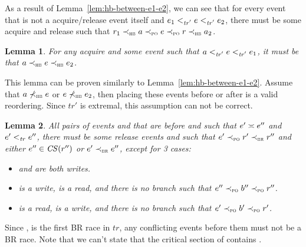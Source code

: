 \documentclass[letter,10pt]{article}
\newtheorem{lem}{Lemma}
\newcommand{\CS}[1]{\ensuremath{\mathit{CS(}#1)}\xspace}
\newcommand{\conflicts}[2]{\ensuremath{#1 \asymp #2}} %
\newcommand{\tr}{\ensuremath{\mathit{tr}}\xspace}
\newcommand{\trPrime}{\ensuremath{\mathit{tr'}}\xspace}
\newcommand{\PO}{PO\xspace}
\newcommand{\HB}{HB\xspace}
\newcommand{\BR}{BR\xspace}
\newcommand{\ltTR}{\ensuremath{<_\textsc{\tr}}\xspace}
\newcommand{\ltTRPrime}{\ensuremath{<_\textsc{\trPrime}}\xspace}
\newcommand{\ltPO}{\ensuremath{\prec_\textsc{\tiny{\PO}}}\xspace}
\newcommand{\ltHB}{\ensuremath{\prec_\textsc{\tiny{\HB}}}\xspace}
\newcommand{\nltHB}{\ensuremath{\not\prec_\textsc{\tiny{\HB}}}\xspace}
\newcommand{\ltBR}{\ensuremath{\prec_\textsc{\tiny{\BR}}}\xspace}
\newcommand{\Ordered}[3]{\ensuremath{#1 #2 #3}}
\newcommand{\OrderedThree}[4]{\Ordered{#2}{#1}{\Ordered{#3}{#1}{#4}}}
\newcommand{\TROrdered}[2]{\Ordered{#1}{\ltTR}{#2}}
\newcommand{\POOrdered}[2]{\Ordered{#1}{\ltPO}{#2}}
\newcommand{\nHBOrdered}[2]{\Ordered{#1}{\nltHB}{#2}}
\newcommand{\HBOrdered}[2]{\Ordered{#1}{\ltHB}{#2}}
\newcommand{\BROrdered}[2]{\Ordered{#1}{\ltBR}{#2}}
\begin{document}
As a result of Lemma~\ref{lem:hb-between-e1-e2}, we can see that for
every event  that is not a acquire/release event itself and
\OrderedThree{\ltTRPrime}{\event{e}{_1}}{\event{e}}{\event{e}{_2}}, there must be
some acquire  and release  such that
\HBOrdered{\event{r}{_1}}{\POOrdered{\event{a}}{\POOrdered{\event{e}}{\HBOrdered{\event{r}}{\event{a}{_2}}}}}.

\begin{lem}
  For any acquire  and some event  such that
  \OrderedThree{\ltTRPrime}{\event{a}}{\event{e}}{\event{e}{_1}}, it must be
  that \OrderedThree{\ltHB}{\event{a}}{\event{e}}{\event{e}{_2}}.
  \label{lem:hb-between-a1-e1}
\end{lem}

This lemma can be proven similarly to Lemma~\ref{lem:hb-between-e1-e2}. Assume that
\nHBOrdered{\event{a}}{\event{e}} or \nHBOrdered{\event{e}}{\event{e}{_2}}, then
placing these events before  or after  is a valid
reordering. Since \trPrime is extremal, this assumption can not be correct.

\begin{lem}
  All pairs of events  and  that are before
   and  such that
  \conflicts{\event{e}{'}}{\event{e}{''}} and
  \TROrdered{\event{e}{'}}{\event{e}{''}}, there must be some release events
   and  such that
  \POOrdered{\event{e}{'}}{\BROrdered{\event{r}{'}}{\event{r}{''}}} and either
  $\event{e}{''} \in \CS{\event{r}{''}}$ or
  \BROrdered{\event{e}{'}}{\event{e}{''}}, except for 3 cases:
  \begin{itemize}
    \item {} and  are both writes.
    \item {} is a write,  is a read, and there is no
      branch  such that
      \POOrdered{\event{e}{''}}{\POOrdered{\event{b}{''}}{\event{r}{''}}}.
    \item {} is a read,  is a write, and there is no
      branch  such that \POOrdered{\event{e}{'}}{\POOrdered{\event{b}{'}}{\event{r}{'}}}.
  \end{itemize}
\end{lem}

Since ,  is the first \BR race in \tr, any conflicting
events before them must not be a \BR race. Note that we can't state that the
critical section of  contains .
\end{document}
